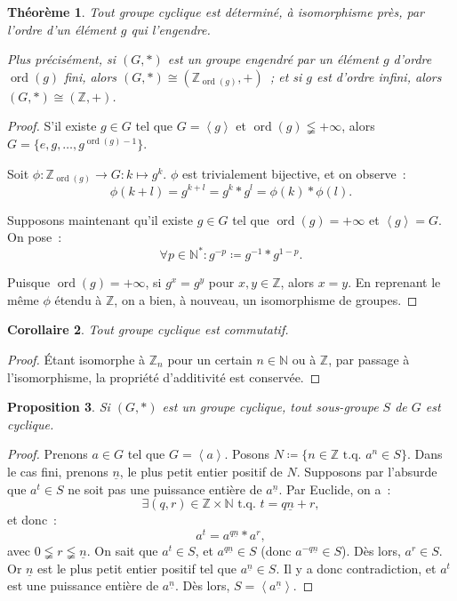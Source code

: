 \documentclass{article}
\newtheorem{thm}{Théorème}[section]
\newtheorem{prp}[thm]{Proposition}
\newtheorem{cor}[thm]{Corollaire}
\theoremstyle{definition}
\theoremstyle{remark}
\DeclareMathOperator{\ord}{ord}
\newcommand{\Z}{\mathbb Z}
\newcommand{\N}{\mathbb N}
\newcommand{\tq}{\text{ t.q. }}
\newcommand{\simeqq}{\cong}
\newcommand{\eng}[1]{\left\langle#1\right\rangle}
\begin{document}
		\begin{thm} Tout groupe cyclique est déterminé, à isomorphisme près, par l'ordre d'un élément $g$ qui l'engendre.

		Plus précisément, si $(G, *)$ est un groupe engendré par un élément $g$ d'ordre $\ord(g)$ fini, alors $(G, *) \simeqq (\Z_{\ord(g)}, +)$~; et si $g$ est
		d'ordre infini, alors $(G, *) \simeqq (\Z, +)$.
		\end{thm}

		\begin{proof} S'il existe $g \in G$ tel que $G = \eng g$ et $\ord(g) \lneqq +\infty$, alors $G = \{e, g, \ldots, g^{\ord(g)-1}\}$.

		Soit $\phi : \Z_{\ord(g)} \to G : k \mapsto g^k$. $\phi$ est trivialement bijective, et on observe~:
		\[\phi(k+l) = g^{k+l} = g^k * g^l = \phi(k) * \phi(l).\]

		Supposons maintenant qu'il existe $g \in G$ tel que $\ord(g) = +\infty$ et $\eng g = G$. On pose~:
		\[\forall p \in \N^* : g^{-p} \coloneqq g^{-1} * g^{1-p}.\]

		Puisque $\ord(g) = +\infty$, si $g^x = g^y$ pour $x, y \in \Z$, alors $x=y$. En reprenant le même $\phi$ étendu à $\Z$, on a bien, à nouveau, un
		isomorphisme de groupes.
		\end{proof}

		\begin{cor} Tout groupe cyclique est commutatif.
		\end{cor}

		\begin{proof} Étant isomorphe à $\Z_n$ pour un certain $n \in \N$ ou à $\Z$, par passage à l'isomorphisme, la propriété d'additivité est conservée.
		\end{proof}

		\begin{prp} Si $(G, *)$ est un groupe cyclique, tout sous-groupe $S$ de $G$ est cyclique.
		\end{prp}

		\begin{proof} Prenons $a \in G$ tel que $G = \eng a$. Posons $N \coloneqq \{n \in \Z \tq a^n \in S\}$. Dans le cas fini, prenons $\underline n$, le
		plus petit entier positif de $N$. Supposons par l'absurde que $a^t \in S$ ne soit pas une puissance entière de $a^{\underline n}$. Par Euclide, on a~:
		\[\exists (q, r) \in \Z \times \N \tq t = q\underline n + r,\]
		et donc~:
		\[a^t = a^{q\underline n} * a^r,\]
		avec $0 \lneqq r \lneqq \underline n$. On sait que $a^t \in S$, et $a^{q\underline n} \in S$ (donc $a^{-q\underline n} \in S$). Dès lors, $a^r \in S$.
		Or $\underline n$ est le plus petit entier positif tel que $a^{\underline n} \in S$. Il y a donc contradiction, et $a^t$ est une puissance entière de
		$a^{\underline n}$. Dès lors, $S = \eng {a^{\underline n}}$.
		\end{proof}
\end{document}
